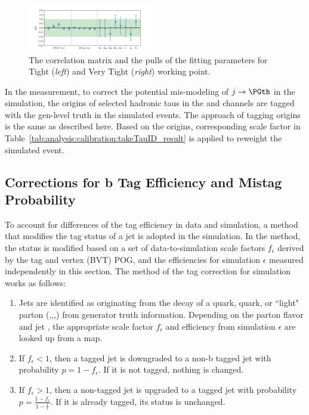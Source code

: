 \begin{figure}[h]
    \includegraphics[width=0.49\textwidth]{chapters/Analysis/sectionCalibration/figures/jetToTauh/pull2_lltauVTight_splitJetFlavor.png}
    \caption{The correlation matrix and the pulls of the fitting parameters for Tight (\emph{left}) and Very Tight (\emph{right}) \PGth working point. }
    \label{fig:analysis:calibration:takeTauID_result}
\end{figure}
In the \BWl measurement, to correct the potential mis-modeling of $j\to \PGth$ in the simulation, the origins of selected hadronic taus in the \cet and \cmt channels are tagged with the gen-level truth in the simulated events. The approach of tagging \PGth origins is the same as described here. Based on the \PGth origins, corresponding scale factor in Table~\ref{tab:analysis:calibration:takeTauID_result} is applied to reweight the simulated event.

\FloatBarrier




\subsection{Corrections for b Tag Efficiency and Mistag Probability}
\label{sec:analysis:calibration:btag}
To account for differences of the \PQb tag efficiency in data and simulation, a method that modifies the \PQb tag status of a jet is adopted in the simulation. In the method, the status is modified based on a set of data-to-simulation scale factors $f_{\epsilon}$ derived by the \PQb tag and vertex (BVT) POG, and the efficiencies for simulation $\epsilon$ measured independently in this section.  The method of the \PQb tag correction for simulation works as follows:
\begin{enumerate}
    \item Jets are identified as originating from the decay of a \PQb quark, \PQc quark, or ``light" parton (\PQu,\PQs,\PQd,\Pg) from generator truth information. Depending on the parton flavor and jet \pt, the appropriate scale factor $f_{\epsilon}$ and efficiency from simulation $\epsilon$ are looked up from a map.
    \item If $f_{\epsilon} < 1$, then a \PQb tagged jet is downgraded to a non-b tagged jet with probability $p = 1 - f_{\epsilon}$. If it is not \PQb tagged, nothing is changed.
    \item If $f_{\epsilon} > 1$, then a non-\PQb tagged jet is upgraded to a \PQb tagged jet with probability $p = \frac{1 - f_{\epsilon}}{1 - \frac{1}{\epsilon}}$. If it is already \PQb tagged, its status is unchanged.
\end{enumerate}



